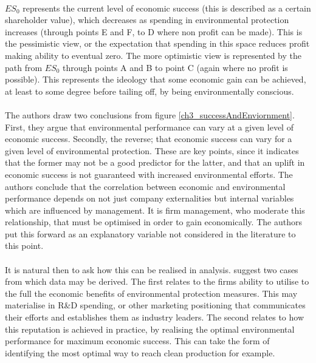 {\begin{figure}[h]
\end{figure}\\
$ES_0$ represents the current level of economic success (this is described as a certain shareholder value), which decreases as spending in environmental protection increases (through points E and F, to D where non profit can be made). This is the pessimistic view, or the expectation that spending in this space reduces profit making ability to eventual zero. The more optimistic view is represented by the path from $ES_0$ through points A and B to point C (again where no profit is possible). This represents the ideology that some economic gain can be achieved, at least to some degree before tailing off, by being environmentally conscious. \\\\
The authors draw two conclusions from figure \ref{ch3_successAndEnviornment}. First, they argue that environmental performance can vary at a given level of economic success. Secondly, the reverse; that economic success can vary for a given level of environmental protection. These are key points, since it indicates that the former may not be a good predictor for the latter, and that an uplift in economic success is not guaranteed with increased environmental efforts. The authors conclude that the correlation between economic and environmental performance depends on not just company externalities but internal variables which are influenced by management. It is firm management, who moderate this relationship, that must be optimised in order to gain economically. The authors put this forward as an explanatory variable not considered in the literature to this point. \\\\It is natural then to ask how this can be realised in analysis. \cite{schaltegger2002link} suggest two cases from which data may be derived. The first relates to the firms ability to utilise to the full the economic benefits of environmental protection measures. This may materialise in R\&D spending, or other marketing positioning that communicates their efforts and establishes them as industry leaders. The second relates to how this reputation is achieved in practice, by realising the optimal environmental performance for maximum economic success. This can take the form of identifying the most optimal way to reach clean production for example.\\\\
}
